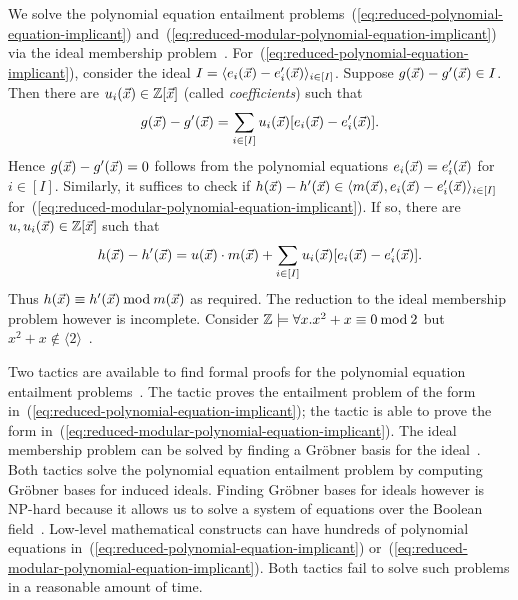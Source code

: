 We solve the polynomial equation entailment
problems~(\ref{eq:reduced-polynomial-equation-implicant})
and~(\ref{eq:reduced-modular-polynomial-equation-implicant}) via
the ideal membership problem~\cite{H:07:AENTP,BS:16:GFEV}.
For~(\ref{eq:reduced-polynomial-equation-implicant}), consider the
ideal $I = \langle e_i(\vec{x}) - e'_i(\vec{x}) \rangle_{i \in [I]}$. Suppose
$g(\vec{x}) - g'(\vec{x}) \in I$. Then there are $u_i(\vec{x}) \in \mathbb{Z}[\vec{x}]$
(called \emph{coefficients}) such that
\begin{equation}
  \label{eq:reduced-polynomial-equation-witnesses}
  g(\vec{x}) - g'(\vec{x}) = \sum\limits_{i \in [I]} u_i (\vec{x}) [e_i (\vec{x}) - e'_i (\vec{x})].
\end{equation}
Hence $g(\vec{x}) - g'(\vec{x}) = 0$ follows from  the polynomial equations
$e_i (\vec{x}) = e'_i (\vec{x})$ for $i \in [I]$. Similarly, it
suffices to check if $h(\vec{x}) - h'(\vec{x}) \in \langle m(\vec{x}), e_i(\vec{x}) -
e'_i(\vec{x}) \rangle_{i \in [I]}$
for~(\ref{eq:reduced-modular-polynomial-equation-implicant}).
If so, there are $u, u_i(\vec{x}) \in \mathbb{Z}[\vec{x}]$ such that
\begin{equation}
  \label{eq:reduced-modular-polynomial-equation-witnesses}
  h(\vec{x}) - h'(\vec{x}) = u(\vec{x}) \cdot m(\vec{x}) + \sum\limits_{i \in [I]} u_i (\vec{x})
  [e_i (\vec{x}) - e'_i (\vec{x})].
\end{equation}
Thus $h(\vec{x}) \equiv h'(\vec{x}) \mathbin{\textmd{mod}} m(\vec{x})$ as required.
The reduction to the ideal membership problem however is
incomplete. Consider $\mathbb{Z} \models \forall x. x^2 + x
\equiv 0 \mathbin{\textmd{mod}} 2$ but $x^2 + x \not\in \langle 2
\rangle$~\cite{H:07:AENTP}.

Two \coq tactics are available to
find formal proofs for the polynomial equation entailment
problems~\cite{P:08:CGBP,P:10:CGBP}. 
The tactic  proves the entailment problem of
the form in~(\ref{eq:reduced-polynomial-equation-implicant}); the
tactic  is able to prove the form
in~(\ref{eq:reduced-modular-polynomial-equation-implicant}). 
The ideal membership problem can be solved by finding a Gr\"obner
basis for the ideal~\cite{C:96:CCANT}. 
Both tactics solve the polynomial equation entailment problem by
computing Gr\"obner bases for induced ideals. Finding Gr\"obner bases
for ideals however is NP-hard because it allows us to solve a
system of equations over the Boolean field~\cite{GJ:1979:CAI}. 
Low-level mathematical constructs can have
hundreds of polynomial equations 
in~(\ref{eq:reduced-polynomial-equation-implicant})
or~(\ref{eq:reduced-modular-polynomial-equation-implicant}). 
Both \coq tactics fail to solve such problems in a reasonable
amount of time. 


